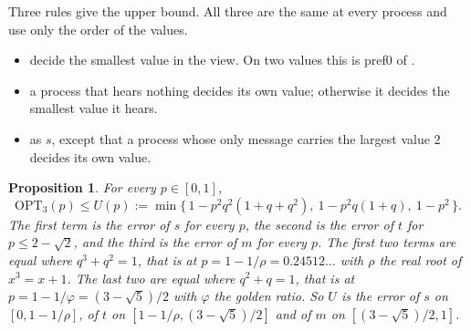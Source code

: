 \documentclass[11pt]{article}
\newtheorem{proposition}[theorem]{Proposition}
\theoremstyle{remark}
\newcommand{\OPT}{\mathrm{OPT}}
\begin{document}
Three rules give the upper bound. All three are the same at every process and use only the order of the values.
\begin{itemize}
\item[$m$:] decide the smallest value in the view. On two values this is pref0 of \cite{FPR26}.
\item[$s$:] a process that hears nothing decides its own value; otherwise it decides the smallest value it hears.
\item[$t$:] as $s$, except that a process whose only message carries the largest value $2$ decides its own value.
\end{itemize}

\begin{proposition}\label{prop:upper}
For every $p\in[0,1]$,
\[
\OPT_3(p)\le U(p):=\min\bigl\{\,1-p^2q^2(1+q+q^2),\ 1-p^2q(1+q),\ 1-p^2\,\bigr\}.
\]
The first term is the error of $s$ for every $p$, the second is the error of $t$ for $p\le 2-\sqrt2$, and the third is the error of $m$ for every $p$. The first two terms are equal where $q^3+q^2=1$, that is at $p=1-1/\rho=0.24512\dots$ with $\rho$ the real root of $x^3=x+1$. The last two are equal where $q^2+q=1$, that is at $p=1-1/\varphi=(3-\sqrt5)/2$ with $\varphi$ the golden ratio. So $U$ is the error of $s$ on $[0,1-1/\rho]$, of $t$ on $[1-1/\rho,(3-\sqrt5)/2]$ and of $m$ on $[(3-\sqrt5)/2,1]$.
\end{proposition}
\end{document}

